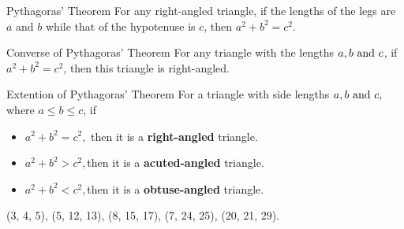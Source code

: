 
\begin{mysubsection}{}
    \begin{theorem}[thm:]{Pythagoras' Theorem}
        For any right-angled triangle, if the lengths of the legs are $a$ and $b$ while that of the hypotenuse is $c$, then $a^2+b^2=c^2$.
    \end{theorem}

    \begin{theorem}[thm:]{Converse of Pythagoras' Theorem}
        For any triangle with the lengths $a, b \textnormal{ and }c$, if $a^2+b^2=c^2$, then this triangle is right-angled.
    \end{theorem}

    \begin{theorem}[thm:]{Extention of Pythagoras' Theorem}
        For a triangle with side lengths $a, b \textnormal{ and }c,$ where $a\leq b\leq c$, if

        \begin{itemize}
            \item $a^2+b^2=c^2,$ then it is a \textbf{right-angled }triangle.
            \item $a^2+b^2>c^2,  $then it is a \textbf{acuted-angled }triangle.
            \item $a^2+b^2<c^2, $then it is a \textbf{obtuse-angled }triangle.
        \end{itemize}

    \end{theorem}

    (3, 4, 5), (5, 12, 13), (8, 15, 17), (7, 24, 25), (20, 21, 29).
\end{mysubsection}
